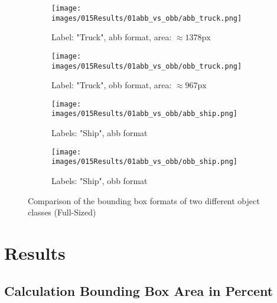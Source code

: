 \begin{figure}[h]
    \centering
    
    \begin{subfigure}[b]{0.45\textwidth}
        \centering
        \texttt{[image: images/015Results/01abb\_vs\_obb/abb\_truck.png]}
        \caption{Label: "Truck", abb format, area: $\approx 1378 \text{px}$}
        \label{fig:abb_truck_fs}
    \end{subfigure}
    \hfill
    \begin{subfigure}[b]{0.45\textwidth}
        \centering
        \texttt{[image: images/015Results/01abb\_vs\_obb/obb\_truck.png]}
        \caption{Label: "Truck", obb format, area: $\approx 967 \text{px}$}
        \label{fig:obb_truck_fs}
    \end{subfigure}
    
    \vspace{0.5cm} %
    
    \begin{subfigure}[b]{0.45\textwidth}
        \centering
        \texttt{[image: images/015Results/01abb\_vs\_obb/abb\_ship.png]}
        \caption{Labels: "Ship", abb format}
        \label{fig:abb_ship_fs}
    \end{subfigure}
    \hfill
    \begin{subfigure}[b]{0.45\textwidth}
        \centering
        \texttt{[image: images/015Results/01abb\_vs\_obb/obb\_ship.png]}
        \caption{Labels: "Ship", obb format}
        \label{fig:obb_ship_fs}
    \end{subfigure}  
    \caption{Comparison of the bounding box formats of two different object classes (Full-Sized)}
    \label{fig:comparison_bb_format_fs}
\end{figure}


\FloatBarrier

\FloatBarrier

\FloatBarrier

\FloatBarrier

\section{Results}
\subsection{Calculation Bounding Box Area in Percent}
\label{ap:calc_bb_area_percent}

